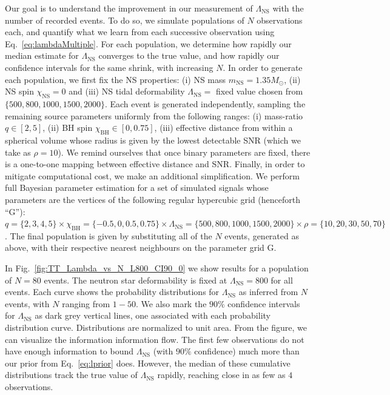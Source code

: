 \documentclass[aps,prd,amsmath,floats,floatfix, twocolumn,
superscriptaddress,nofootinbib,showpacs]{revtex4-1}
\newcommand{\lambdans}{\Lambda_\mathrm{NS}}
\newcommand{\chibh}{\chi_\mathrm{BH}}
\newcommand{\chins}{\chi_\mathrm{NS}}
\newcommand{\mns}{m_\mathrm{NS}}
\begin{document}
Our goal is to understand the improvement in our measurement of $\lambdans$
with the number of recorded events. To do so, we simulate populations of $N$
observations each, and quantify what we learn from each successive observation 
using Eq.~\ref{eq:lambdaMultiple}. For each population, we determine how
rapidly our median estimate for $\lambdans$ converges to the true value,
and how rapidly our confidence intervals for the same shrink, with increasing
$N$. In order to generate each population, we first fix
the NS properties: (i) NS mass $\mns=1.35M_\odot$, (ii) NS spin $\chins=0$
and (iii) NS tidal deformability $\lambdans=$ fixed value chosen from
$\{500,800,1000,1500,2000\}$. Each event is generated independently, sampling
the remaining source parameters uniformly from the following ranges: (i)
mass-ratio $q\in[2,5]$, (ii) BH spin $\chibh\in[0, 0.75]$, (iii) effective 
distance from within a spherical volume whose radius is given by the lowest 
detectable SNR (which we take as $\rho=10$). We remind ourselves that
once binary parameters are fixed, there is a one-to-one mapping between
effective distance and SNR. Finally, in order to mitigate computational
cost, we make an additional simplification.
We perform full Bayesian parameter estimation for a set of simulated signals
whose parameters are the vertices of the following regular hypercubic grid
(henceforth ``G''):
$q=\{2,3,4,5\}\times\chibh=\{-0.5,0,0.5,0.75\}\times\lambdans=\{500,800,1000,1500,2000\}\times\rho=\{10,20,30,50,70\}$.
The final population is given by substituting all of the $N$ events, generated
as above, with their respective nearest neighbours on the parameter grid G.


In Fig.~\ref{fig:TT_Lambda_vs_N_L800_CI90_0} we show results for a population
of $N=80$ events. The neutron star deformability is fixed at $\lambdans=800$
for all events. Each curve shows the probability distributions for $\lambdans$
as inferred from $N$ events, with $N$ ranging from $1-50$. We also mark the 
$90\%$ confidence intervals for $\lambdans$ as dark grey vertical lines,
one associated with each probability distribution curve. Distributions are 
normalized to unit area. From the figure, we can visualize the information 
information flow. The first few observations do not have enough information 
to bound $\lambdans$ (with $90\%$ confidence) much more than our prior from
Eq.~\ref{eq:lprior} does. However, the median of these cumulative distributions
track the true value of $\lambdans$ rapidly, reaching close in as few as $4$
observations.
\end{document}
